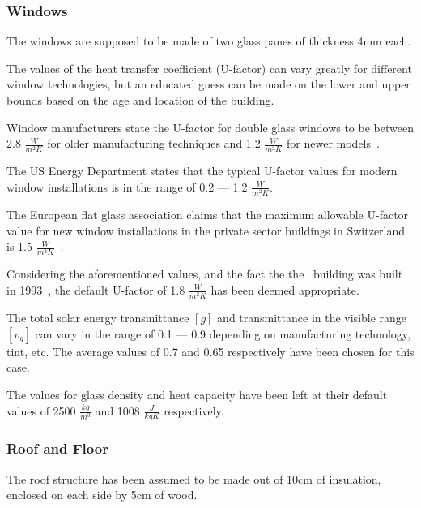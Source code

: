 \subsubsection{Windows}

The windows are supposed to be made of two glass panes of thickness 4mm each.

The values of the heat transfer coefficient (U-factor) can vary greatly for
different window technologies, but an educated guess can be made on the lower
and upper bounds based on the age and location of the building. 

Window manufacturers state
the U-factor for double glass windows to be between 2.8 \(\frac{W}{m^2K}\) for
older manufacturing techniques and 1.2 \(\frac{W}{m^2K}\) for newer
models~\cite{WhatAreTypical2018}. 

The US Energy Department states that the
typical U-factor values for modern window installations is in the range of 0.2
--- 1.2 \(\frac{W}{m^2K}\)\cite{GuideEnergyEfficientWindows}. 

The European flat glass association claims that the maximum allowable U-factor
value for new window installations in the private sector buildings in
Switzerland is 1.5
\(\frac{W}{m^2K}\)~\cite{glassforeuropeMinimumPerformanceRequirements2018}.

Considering the aforementioned values, and the fact the the \pdome\ building was
built in 1993~\cite{nattererModelingMultilayerBeam2008}, the default U-factor of
1.8 \(\frac{W}{m^2K}\) has been deemed appropriate.

The total solar energy transmittance $[g]$ and transmittance in the visible
range $[v_g]$ can vary in the range of 0.1 --- 0.9 depending on manufacturing
technology, tint, etc. The average values of 0.7 and 0.65 respectively have been
chosen for this case.

The values for glass density and heat capacity have been left at their default
values of 2500 \(\frac{kg}{m^3}\) and 1008 \(\frac{J}{kgK}\) respectively.

\subsubsection{Roof and Floor}


The roof structure has been assumed to be made out of 10cm of insulation,
enclosed on each side by 5cm of wood.

